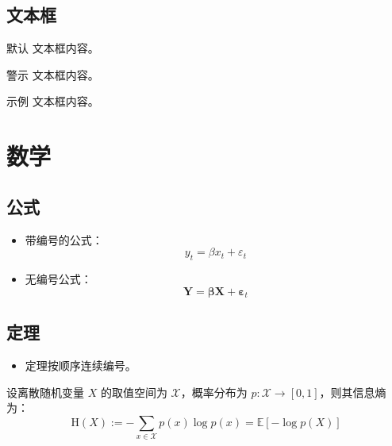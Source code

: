 \documentclass[
11pt,notheorems,hyperref={pdfauthor=whatever},aspectratio=169
]{beamer}
\begin{document}
\subsection{文本框}
\begin{frame}
   \centering
    \begin{minipage}[b]{0.5\textwidth}
      \begin{block}{默认}
        文本框内容。
      \end{block}

      \begin{alertblock}{警示}
        文本框内容。
      \end{alertblock}

      \begin{exampleblock}{示例}
        文本框内容。
      \end{exampleblock}
    \end{minipage}
\end{frame}

\section{数学}
\subsection{公式}
\begin{frame}
    \begin{itemize}
        \item 带编号的公式：
        \begin{equation}
            y_t = \beta x_t + \varepsilon_t
        \end{equation}
        \item 无编号公式：
        \begin{equation*}
            \mathbf{Y} = \boldsymbol{\beta} \mathbf{X} + \boldsymbol{\varepsilon}_t
        \end{equation*}
    \end{itemize}
\end{frame}

\subsection{定理}
\begin{frame}
    \begin{itemize}
        \item 定理按顺序连续编号。
    \end{itemize}
    \begin{theorem}[示例定理]
        设离散随机变量 $X$ 的取值空间为 $\mathcal{X}$，概率分布为 $p:{\mathcal{X}}\to[0,1]$，则其信息熵为：
        \begin{equation}
            \mathrm{H}(X) := -\sum_{x\in\mathcal{X}} p(x)\log p(x) = \mathbb{E}[-\log p(X)]
        \end{equation}
    \end{theorem}
\end{frame}
\end{document}

